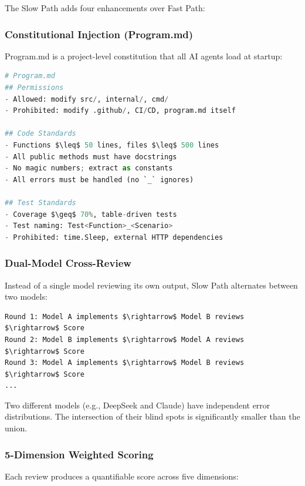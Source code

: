 \documentclass[11pt,a4paper]{article}
\begin{document}
The Slow Path adds four enhancements over Fast Path:

\subsubsection{Constitutional Injection (Program.md)}

Program.md is a project-level constitution that all AI agents load at startup:

\begin{lstlisting}[language=Python,frame=none,numbers=none]
# Program.md
## Permissions
- Allowed: modify src/, internal/, cmd/
- Prohibited: modify .github/, CI/CD, program.md itself

## Code Standards
- Functions $\leq$ 50 lines, files $\leq$ 500 lines
- All public methods must have docstrings
- No magic numbers; extract as constants
- All errors must be handled (no `_` ignores)

## Test Standards
- Coverage $\geq$ 70%, table-driven tests
- Test naming: Test<Function>_<Scenario>
- Prohibited: time.Sleep, external HTTP dependencies
\end{lstlisting}

\subsubsection{Dual-Model Cross-Review}

Instead of a single model reviewing its own output, Slow Path alternates between two models:

\begin{lstlisting}[frame=none,numbers=none]
Round 1: Model A implements $\rightarrow$ Model B reviews $\rightarrow$ Score
Round 2: Model B implements $\rightarrow$ Model A reviews $\rightarrow$ Score
Round 3: Model A implements $\rightarrow$ Model B reviews $\rightarrow$ Score
...
\end{lstlisting}

Two different models (e.g., DeepSeek and Claude) have independent error distributions. The intersection of their blind spots is significantly smaller than the union.

\subsubsection{5-Dimension Weighted Scoring}

Each review produces a quantifiable score across five dimensions:
\end{document}
